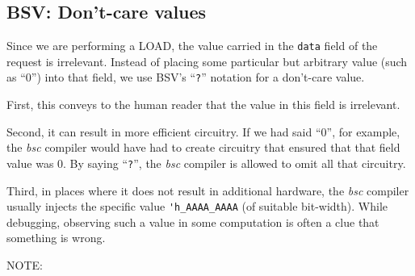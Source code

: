 
\subsection{BSV: Don't-care values} 


Since we are performing a LOAD, the value carried in the \verb|data|
field of the request is irrelevant.  Instead of placing some
particular but arbitrary value (such as ``0'') into that field, we use
BSV's ``\verb|?|'' notation for a don't-care value.

First, this conveys to the human reader that the value in this field
is irrelevant.

Second, it can result in more efficient circuitry.  If we had said
``0'', for example, the \emph{bsc} compiler would have had to create
circuitry that ensured that that field value was 0. By saying
``\verb|?|'', the \emph{bsc} compiler is allowed to omit all that
circuitry.

Third, in places where it does not result in additional hardware, the
\emph{bsc} compiler usually injects the specific value
\verb|'h_AAAA_AAAA| (of suitable bit-width).  While debugging,
observing such a value in some computation is often a clue that
something is wrong.

\vspace{2ex}

NOTE:


